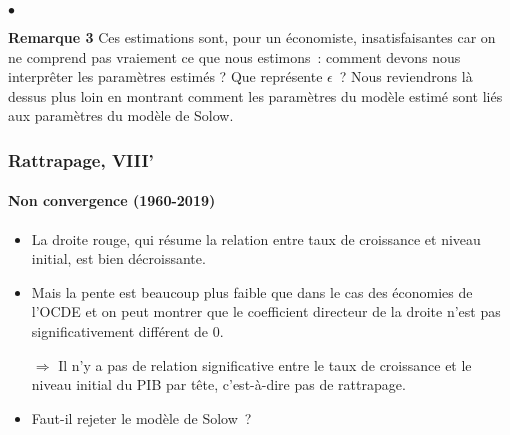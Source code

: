 \documentclass[10pt,notheorems]{beamer}
\theoremstyle{plain}
\theoremstyle{definition} %
\begin{document}
\begin{notes}
\begin{list}{$\bullet$}{}
    \item[\textbf{Remarque 3}] Ces estimations sont, pour un économiste, insatisfaisantes
      car on ne comprend pas vraiement ce que nous estimons~: comment devons
      nous interprêter les paramètres estimés ? Que représente $\epsilon$~? Nous
      reviendrons là dessus plus loin en montrant comment les paramètres du
      modèle estimé sont liés aux paramètres du modèle de Solow.

  \end{list}

\end{notes}


\begin{frame}
  \frametitle{Rattrapage, VIII'}
  \framesubtitle{Non convergence (1960-2019)}

  \begin{itemize}

  \item La droite rouge, qui résume la relation entre taux de croissance et
    niveau initial, est bien décroissante.\newline

  \item Mais la pente est beaucoup plus faible que dans le cas des économies de
    l'OCDE et on peut montrer que le coefficient directeur de la droite n'est
    pas significativement différent de 0.\newline

  \item[$\Rightarrow$] Il n'y a pas de relation significative entre le taux de
    croissance et le niveau initial du PIB par tête, c'est-à-dire pas de rattrapage.\newline

    \bigskip

  \item Faut-il rejeter le modèle de Solow~?

  \end{itemize}

\end{frame}
\end{document}
